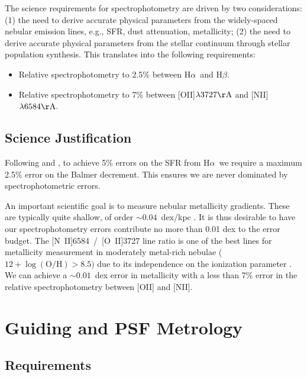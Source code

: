 \documentclass[preprint,11pt]{aastex}
\newcommand{\Halpha}{{H$\alpha$}}
\newcommand{\Hbeta}{{H$\beta$}}
\begin{document}
The science requirements for spectrophotometry are driven by two
considerations: (1) the need to derive accurate physical parameters
from the widely-spaced nebular emission lines, e.g., SFR, dust
attenuation, metallicity; (2) the need to derive accurate physical
parameters from the stellar continuum through stellar population
synthesis. This translates into the following requirements:

\begin{itemize}
\item Relative spectrophotometry to 2.5\% between \Halpha\ and \Hbeta.
\item Relative spectrophotometry to 7\% between [OII]$\lambda3727{\rm \AA}$ and [NII]$\lambda6584{\rm \AA}$. 
\end{itemize}

\subsection{Science Justification}

Following \citet{kennicutt1998} and \citet{calzetti01}, to achieve 5\%
errors on the SFR from \Halpha\ we require a maximum 2.5\% error on the Balmer
decrement. This ensures we are never dominated by spectrophotometric
errors.

An important scientific goal is to measure nebular metallicity
gradients. These are typically quite shallow, of order
$\sim0.04$~dex/kpc \citep{vanzee1996}. It is thus desirable to
have our spectrophotometry errors contribute no more than 0.01 dex to
the error budget. The [N~II]6584~/~[O~II]3727 line ratio is one of the
best lines for metallicity measurement in moderately metal-rich
nebulae ($12 + \log(\mathrm{O/H}) > 8.5)$ due to its independence on
the ionization parameter \citep{kewley02}. We can achieve a
$\sim0.01$~dex error in metallicity with a less than 7\% error in the relative
spectrophotometry between [OII] and [NII].

\section{Guiding and PSF Metrology} \label{sec:guiding}

\subsection{Requirements}
\end{document}
